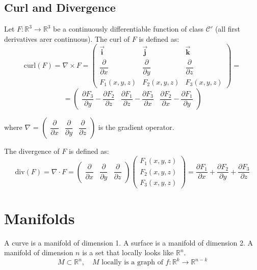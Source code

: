 \documentclass[11pt]{article}
\begin{document}
\subsection{Curl and Divergence}
Let $F : \mathbb{R}^3 \rightarrow \mathbb{R}^3$ be a continuously differentiable function of class $\mathcal{C}'$ (all first derivatives arer continuous). The curl of $F$ is defined as:
\[
\text{curl} (F) = \nabla \times F = \begin{pmatrix}
    \overrightarrow{\mathbf{i}} & \overrightarrow{\mathbf{j}} & \overrightarrow{\mathbf{k}} \\
    \dfrac{\partial}{\partial x} & \dfrac{\partial}{\partial y} & \dfrac{\partial}{\partial z} \\
    F_1(x,y,z) & F_2(x,y,z) & F_3(x,y,z)
\end{pmatrix} = \]
\[
= \begin{pmatrix}
    \dfrac{\partial F_3}{\partial y} - \dfrac{\partial F_2}{\partial z} &
    \dfrac{\partial F_1}{\partial z} - \dfrac{\partial F_3}{\partial x} &
    \dfrac{\partial F_2}{\partial x} - \dfrac{\partial F_1}{\partial y}
\end{pmatrix}
\]

where $\nabla$ = $\begin{pmatrix}
    \dfrac{\partial}{\partial x} & \dfrac{\partial}{\partial y} & \dfrac{\partial}{\partial z}
\end{pmatrix}$ is the gradient operator.

The divergence of $F$ is defined as:
\[
\text{div} (F) = \nabla \cdot F = \begin{pmatrix}
    \dfrac{\partial}{\partial x} & \dfrac{\partial}{\partial y} & \dfrac{\partial}{\partial z}
\end{pmatrix} \begin{pmatrix}
    F_1(x,y,z) \\
    F_2(x,y,z) \\
    F_3(x,y,z)
\end{pmatrix} = \dfrac{\partial F_1}{\partial x} + \dfrac{\partial F_2}{\partial y} + \dfrac{\partial F_3}{\partial z}
\]

\section{Manifolds}
A curve is a manifold of dimension 1. A surface is a manifold of dimension 2. A manifold of dimension $n$ is a set that locally looks like $\mathbb{R}^n$.
\[
M \subset \mathbb{R}^n, \quad M \text{ locally is a graph of } f : \mathbb{R}^k \rightarrow \mathbb{R}^{n-k}
\]
\end{document}
